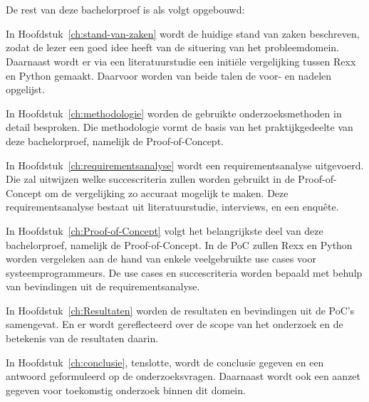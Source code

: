 \section{}%
\label{sec:opzet-bachelorproef}


De rest van deze bachelorproef is als volgt opgebouwd:

In Hoofdstuk~\ref{ch:stand-van-zaken} wordt de huidige stand van zaken beschreven, zodat de lezer een goed idee heeft van de situering van het probleemdomein. Daarnaast wordt er via een literatuurstudie een initiële vergelijking tussen Rexx en Python gemaakt. Daarvoor worden van beide talen de voor- en nadelen opgelijst.

In Hoofdstuk~\ref{ch:methodologie} worden de gebruikte onderzoeksmethoden in detail besproken. Die methodologie vormt de basis van het praktijkgedeelte van deze bachelorproef, namelijk de Proof-of-Concept.


In Hoofdstuk~\ref{ch:requirementsanalyse} wordt een requirementsanalyse uitgevoerd. Die zal uitwijzen welke succescriteria zullen worden gebruikt in de Proof-of-Concept om de vergelijking zo accuraat mogelijk te maken. Deze requirementsanalyse bestaat uit literatuurstudie, interviews, en een enquête.

In Hoofdstuk~\ref{ch:Proof-of-Concept} volgt het belangrijkste deel van deze bachelorproef, namelijk de Proof-of-Concept. In de PoC zullen Rexx en Python worden vergeleken aan de hand van enkele veelgebruikte use cases voor systeemprogrammeurs. De use cases en succescriteria worden bepaald met behulp van bevindingen uit de requirementsanalyse.

In Hoofdstuk~\ref{ch:Resultaten} worden de resultaten en bevindingen uit de PoC's samengevat. En er wordt gereflecteerd over de scope van het onderzoek en de betekenis van de resultaten daarin.

In Hoofdstuk~\ref{ch:conclusie}, tenslotte, wordt de conclusie gegeven en een antwoord geformuleerd op de onderzoeksvragen. Daarnaast wordt ook een aanzet gegeven voor toekomstig onderzoek binnen dit domein.